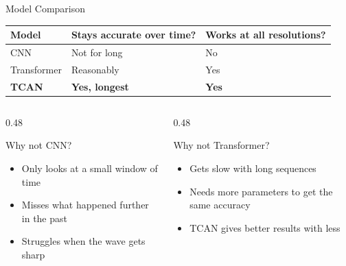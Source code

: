 \begin{frame}{Model Comparison}
\centering
\vspace{1em}
\begin{minipage}{0.88\textwidth}
    \centering
    \fontsize{6.5}{9}\selectfont
    \begin{tabularx}{\textwidth}{|p{2.5cm}|X|X|}
        \hline
        \textbf{Model} & \textbf{Stays accurate over time?} & \textbf{Works at all resolutions?} \\
        \hline
        CNN          & Not for long  & No \\
        \hline
        Transformer  & Reasonably    & Yes \\
        \hline
        \textbf{TCAN} & \textbf{Yes, longest} & \textbf{Yes} \\
        \hline
    \end{tabularx}
\end{minipage}

\vspace{0.5em}
\begin{columns}
    \begin{column}{0.48\textwidth}
      \begin{block}{Why not CNN?}
        \begin{itemize}
          \item Only looks at a small window of time
          \item Misses what happened further in the past
          \item Struggles when the wave gets sharp
        \end{itemize}
      \end{block}
    \end{column}
    \begin{column}{0.48\textwidth}
      \begin{block}{Why not Transformer?}
        \begin{itemize}
          \item Gets slow with long sequences
          \item Needs more parameters to get the same accuracy
          \item TCAN gives better results with less
        \end{itemize}
      \end{block}
    \end{column}
\end{columns}
\end{frame}
